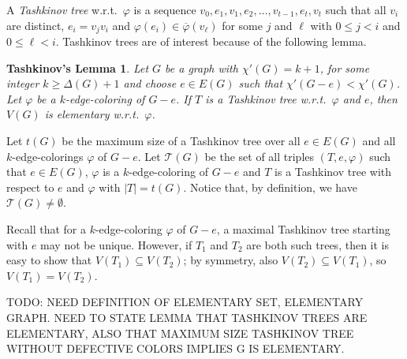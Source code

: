 \documentclass[12pt]{amsart}
\theoremstyle{plain}
\newtheorem*{lemmaA}{Tashkinov's Lemma}
\theoremstyle{definition}
\theoremstyle{remark}
\newcommand{\fancy}[1]{\mathcal{#1}}
\newcommand{\T}{\fancy{T}}
\newcommand{\vph}{\varphi}
\newcommand{\vphn}{\overline{\varphi}}
\begin{document}
A \emph{Tashkinov tree} w.r.t.~$\varphi$ is a sequence $v_0, e_1, v_1,
e_2,\ldots, v_{t-1},e_t,v_t$ such that all $v_i$ are distinct, $e_i=v_jv_i$ and
$\vph(e_i)\in \vphn(v_\ell)$ for some $j$ and $\ell$ with $0\le j< i$ and $0\le
\ell < i$.  Tashkinov trees are of interest because of the following lemma. 

\begin{lemmaA}%
Let $G$ be a graph with $\chi'(G)=k+1$, for some integer $k\ge \Delta(G)+1$ and
choose $e\in E(G)$ such that $\chi'(G-e)<\chi'(G)$.  Let $\varphi$ be a
$k$-edge-coloring of $G-e$.  If $T$ is a Tashkinov tree w.r.t.~$\varphi$ and
$e$, then $V(G)$ is elementary w.r.t.~$\varphi$.
\end{lemmaA}

Let $t(G)$ be the maximum size of a Tashkinov tree over all $e \in E(G)$
and all $k$-edge-colorings $\vph$ of $G - e$.  Let $\T(G)$ be the set of all triples $(T,e,\vph)$ such that $e \in E(G)$, $\vph$ is a $k$-edge-coloring of $G-e$ and
$T$ is a Tashkinov tree with respect to $e$ and $\vph$ with $|T| = t(G)$.  Notice that, by definition, we have $\T(G) \ne \emptyset$.

Recall that for a $k$-edge-coloring $\vph$ of $G-e$, a maximal Tashkinov tree
starting with $e$ may not be unique.  However, if $T_1$ and $T_2$ are both such
trees, then it is easy to show that $V(T_1)\subseteq V(T_2)$; by symmetry, also
$V(T_2)\subseteq V(T_1)$, so $V(T_1)=V(T_2)$.

TODO: NEED DEFINITION OF ELEMENTARY SET, ELEMENTARY GRAPH.  NEED TO STATE LEMMA THAT TASHKINOV TREES ARE ELEMENTARY, ALSO THAT MAXIMUM SIZE TASHKINOV TREE WITHOUT DEFECTIVE COLORS IMPLIES G IS ELEMENTARY.
\end{document}
